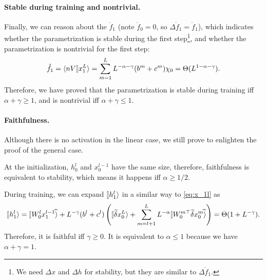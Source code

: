 \documentclass{article}
\theoremstyle{plain}
\theoremstyle{definition}
\begin{document}
\paragraph{Stable during training and nontrivial.} Finally, we can reason about the $\mathring f_1$ (note $\mathring f_0=0$, so $\Delta \mathring f_1=\mathring f_1$), which indicates whether the parametrization is stable during the first step\footnote{We need $\Delta x$ and $\Delta h$ for stability, but they are similar to $\Delta \mathring f_1$.}, and whether the parametrization is nontrivial for the first step:
\[\mathring f_1 = \braket{nV}{x_1^L} = \sum_{m=1}^L L^{-\alpha-\gamma} (b^m+c^m) \chi_0=\Theta(L^{1-\alpha-\gamma}).\]
Therefore, we have proved  that the parametrization is stable during training iff $\alpha + \gamma \geq 1$, and is nontrivial iff $\alpha + \gamma \leq 1$.

\paragraph{Faithfulness.} Although there is no activation in the linear case, we still prove  to enlighten the proof of the general case. 

At the initialization, $h_0^l$ and $x_0^{l-1}$ have the same size, therefore, faithfulness is equivalent to stability, which means it happens iff $\alpha \geq 1/2$.

During training, we can expand $\ket{h_1^l}$ in a similar way to \cref{eq:x_1l} as
\[\ket{h_1^l}=\hatket{W_0^l x_1^{l-1}} + L^{-\gamma} (b^l+c^l)\left(\ket{\tilde \del x_0^L} + \sum_{m=l+1}^L L^{-\alpha} \hatket{W_0^{m\top} \tilde \del x_0^m}\right)=\Theta(1+L^{-\gamma}).\]
Therefore, it is faithful iff $\gamma\geq 0$. It is equivalent to $\alpha\leq 1$ because we have $\alpha+\gamma=1$.
\end{document}
